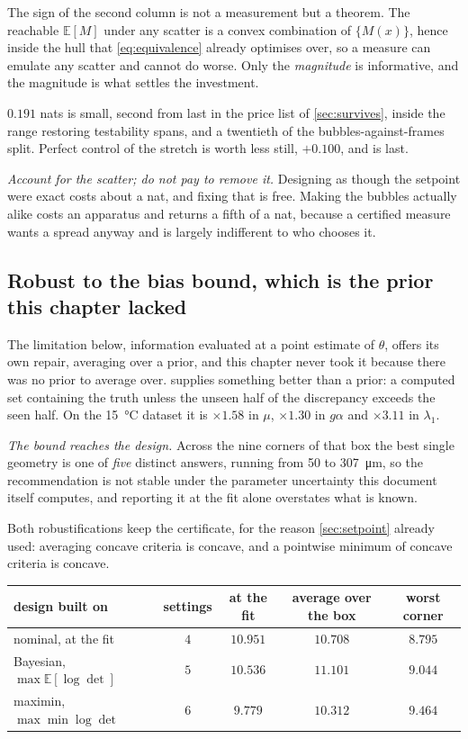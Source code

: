 \documentclass[10pt]{article}
\begin{document}
The sign of the second column is not a measurement but a theorem. The reachable
$\mathbb{E}[M]$ under any scatter is a convex combination of $\{M(x)\}$, hence inside the hull
that \eqref{eq:equivalence} already optimises over, so a measure can emulate any scatter and
cannot do worse. Only the \emph{magnitude} is informative, and the magnitude is what settles
the investment.

$0.191$ nats is small, second from last in the price list of \cref{sec:survives}, inside the
range restoring testability spans, and a twentieth of the bubbles-against-frames split. Perfect
control of the stretch is worth less still, $+0.100$, and is last.

\emph{Account for the scatter; do not pay to remove it.} Designing as though the setpoint were
exact costs about a nat, and fixing that is free. Making the bubbles actually alike costs an
apparatus and returns a fifth of a nat, because a certified measure wants a spread anyway and is
largely indifferent to who chooses it.

\subsection*{Robust to the bias bound, which is the prior this chapter lacked}
\label{sec:biasdesign}

The limitation below, information evaluated at a point estimate of $\theta$, offers its own
repair, averaging over a prior, and this chapter never took it because there was no prior to
average over.  supplies something better than a prior: a computed set
containing the truth unless the unseen half of the discrepancy exceeds the seen half. On the
\SI{15}{\celsius} dataset it is $\times1.58$ in $\mu$, $\times1.30$ in $g\alpha$ and $\times3.11$
in $\lambda_1$.

\emph{The bound reaches the design.} Across the nine corners of that box the best single geometry
is one of \emph{five} distinct answers, running from \SI{50}{} to \SI{307}{\micro\metre}, so
the recommendation is not stable under the parameter uncertainty this document itself computes,
and reporting it at the fit alone overstates what is known.

Both robustifications keep the certificate, for the reason \cref{sec:setpoint} already used:
averaging concave criteria is concave, and a pointwise minimum of concave criteria is concave.

\begin{center}
\begin{tabular}{lcccc}
\toprule
design built on & settings & at the fit & average over the box & worst corner \\
\midrule
nominal, at the fit & $4$ & $\mathbf{10.951}$ & $10.708$ & $8.795$ \\
Bayesian, $\max \mathbb{E}[\log\det]$ & $5$ & $10.536$ & $\mathbf{11.101}$ & $9.044$ \\
maximin, $\max \min \log\det$ & $6$ & $9.779$ & $10.312$ & $\mathbf{9.464}$ \\
\bottomrule
\end{tabular}
\end{center}
\end{document}
